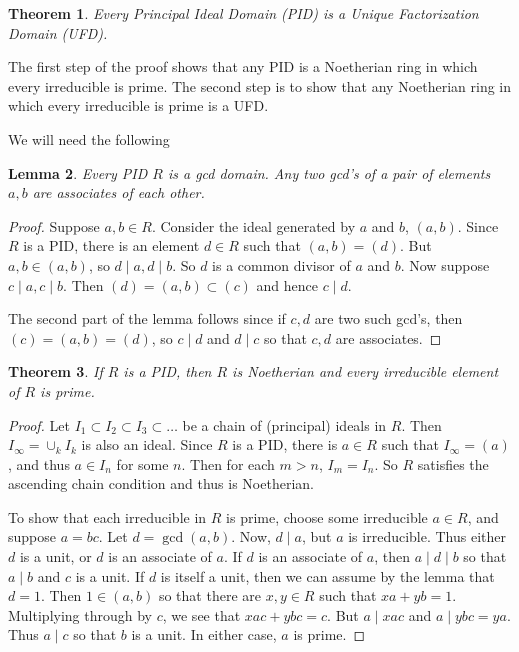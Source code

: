 \documentclass[12pt]{article}
\newtheorem{thm}{Theorem}
\newtheorem{lem}[thm]{Lemma}
\theoremstyle{definition}
\begin{document}
\begin{thm} Every Principal Ideal Domain (PID) is a Unique Factorization Domain (UFD).
\end{thm}

The first step of the proof shows that any PID is a Noetherian ring in which every irreducible is prime. The second step is to show that any Noetherian ring in which every irreducible is prime is a UFD.

We will need the following
\begin{lem} Every PID $R$ is a gcd domain. Any two gcd's of a pair of elements $a,b$ are associates of each other.
\end{lem}
\begin{proof} Suppose $a,b\in R$. Consider the ideal generated by $a$ and $b$, $(a,b)$. Since $R$ is a PID, there is an element $d\in R$ such that $(a,b)=(d)$. But $a,b\in(a,b)$, so $d\mid a, d\mid b$. So $d$ is a common divisor of $a$ and $b$. Now suppose $c\mid a, c\mid b$. Then $(d)=(a,b)\subset (c)$ and hence $c\mid d$.

The second part of the lemma follows since if $c,d$ are two such gcd's, then $(c)=(a,b)=(d)$, so $c\mid d$ and $d\mid c$ so that $c,d$ are associates.
\end{proof}

\begin{thm} If $R$ is a PID, then $R$ is Noetherian and every irreducible element of $R$ is prime.
\end{thm}
\begin{proof}

Let $I_1\subset I_2\subset I_3\subset \ldots$ be a chain of (principal) ideals
in $R$. Then $I_\infty = \cup_k I_k$ is also an ideal. Since $R$ is a PID, there is $a\in R$ such that $I_\infty=(a)$, and thus $a\in I_n$ for some $n$. Then for each $m>n$, $I_m=I_n$. So $R$ satisfies the ascending chain condition and thus is Noetherian.

To show that each irreducible in $R$ is prime, choose some irreducible $a\in R$, and suppose $a=bc$. Let $d=\gcd(a,b)$. Now, $d\mid a$, but $a$ is irreducible. Thus either $d$ is a unit, or $d$ is an associate of $a$. If $d$ is an associate of $a$, then $a\mid d\mid b$ so that $a\mid b$ and $c$ is a unit. If $d$ is itself a unit, then we can assume by the lemma that $d=1$. Then $1\in(a,b)$ so that there are $x,y\in R$ such that $xa+yb=1$. Multiplying through by $c$, we see that $xac+ybc=c$. But $a\mid xac$ and $a\mid ybc=ya$. Thus $a\mid c$ so that $b$ is a unit. In either case, $a$ is prime.
\end{proof}
\end{document}
